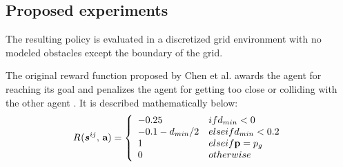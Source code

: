 \documentclass[conference]{IEEEtran}
\begin{document}
\subsection{Proposed experiments}
The resulting policy is evaluated in a discretized grid environment with no modeled obstacles except the boundary of the grid.

The original reward function proposed by Chen et al. awards the agent for reaching its goal and penalizes the agent for getting too close or colliding with the other agent \cite{chen2017cadrl}. It is described mathematically below:
\begin{equation} 
\Reward{}(\state{ij}{}, \, \textbf{a})=
\left\{
    \begin{array}{ll}
        -0.25 & \mbox{if } d_{min}<0  \\
        -0.1 - d_{min}/2 & \mbox{else if } d_{min}<0.2\\
        1 & \mbox{else if }  \textbf{p}=p_{g} \\
        0 & \mbox{otherwise }\\
    \end{array}
\right. 
\label{eqn:reward1}
\end{equation}
\end{document}
